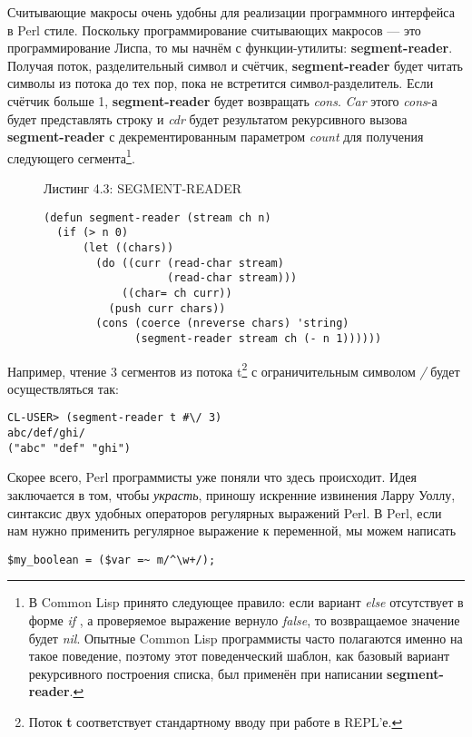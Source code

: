 Считывающие макросы очень удобны для реализации программного интерфейса в Perl стиле. Поскольку программирование считывающих макросов --- это программирование Лиспа, то мы начнём с функции-утилиты: \textbf{segment-reader}. Получая поток, разделительный символ и счётчик, \textbf{segment-reader} будет читать символы из потока до тех пор, пока не встретится символ-разделитель. Если счётчик больше 1, \textbf{segment-reader} будет возвращать \emph{cons}. \emph{Car} этого \emph{cons}-а будет представлять строку и \emph{cdr} будет результатом рекурсивного вызова \textbf{segment-reader} с декрементированным параметром \emph{count} для получения следующего сегмента\footnote{В Common Lisp принято следующее правило: если вариант \emph{else} отсутствует в форме \emph{if} , а проверяемое выражение вернуло \emph{false}, то возвращаемое значение будет \emph{nil}. Опытные Common Lisp программисты часто полагаются именно на такое поведение, поэтому этот поведенческий шаблон, как базовый вариант рекурсивного построения списка, был применён при написании \textbf{segment-reader}.}.

\begin{figure}Листинг 4.3: SEGMENT-READER\label{listing_4.3}
\listbegin
\begin{verbatim}
(defun segment-reader (stream ch n)
  (if (> n 0)
      (let ((chars))
        (do ((curr (read-char stream)
                   (read-char stream)))
            ((char= ch curr))
          (push curr chars))
        (cons (coerce (nreverse chars) 'string)
              (segment-reader stream ch (- n 1))))))
\end{verbatim}
\listend
\end{figure}

Например, чтение 3 сегментов из потока t\footnote{Поток \textbf{t} соответствует стандартному вводу при работе в REPL'е.} с ограничительным символом \emph{/} будет осуществляться так:

\begin{verbatim}
CL-USER> (segment-reader t #\/ 3)
abc/def/ghi/
("abc" "def" "ghi")
\end{verbatim}

Скорее всего, Perl программисты уже поняли что здесь происходит. Идея заключается в том, чтобы \emph{украсть}, приношу искренние извинения Ларру Уоллу, синтаксис двух удобных операторов регулярных выражений Perl. В Perl, если нам нужно применить регулярное выражение к переменной, мы можем написать

\begin{verbatim}
$my_boolean = ($var =~ m/^\w+/);
\end{verbatim}

